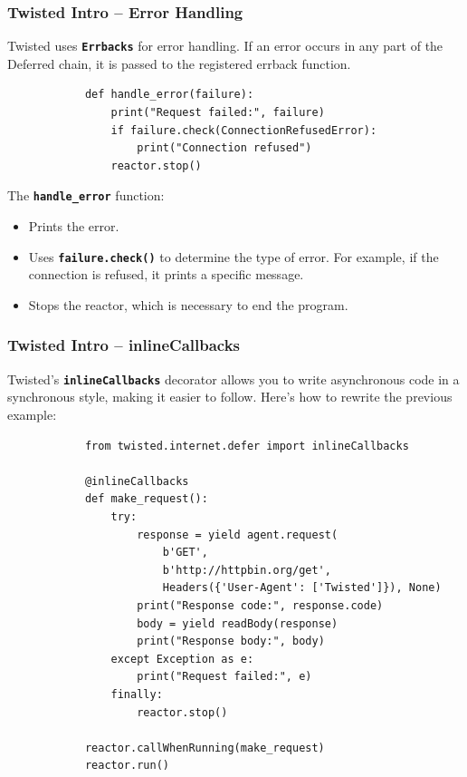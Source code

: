\documentclass{beamer}
\begin{document}
    \begin{frame}[containsverbatim]
        \frametitle{Twisted Intro -- Error Handling}

        Twisted uses \textbf{\texttt{Errbacks}} for error handling. If an error occurs in any part of the Deferred chain, it is passed to the registered errback function.
        \begin{lstlisting}
            def handle_error(failure):
                print("Request failed:", failure)
                if failure.check(ConnectionRefusedError):
                    print("Connection refused")
                reactor.stop()
            \end{lstlisting}
            \noindent The \textbf{\texttt{handle\_error}} function:
            \begin{itemize}
                \item Prints the error.
                \item Uses \textbf{\texttt{failure.check()}} to determine the type of error. For example, if the connection is refused, it prints a specific message.
                \item Stops the reactor, which is necessary to end the program.
            \end{itemize}
    \end{frame}

    \begin{frame}[containsverbatim]
        \frametitle{Twisted Intro -- inlineCallbacks}
        Twisted's \textbf{\texttt{inlineCallbacks}} decorator allows you to write asynchronous code in a synchronous style, making it easier to follow. Here's how to rewrite the previous example:

        \begin{lstlisting}
            from twisted.internet.defer import inlineCallbacks

            @inlineCallbacks
            def make_request():
                try:
                    response = yield agent.request(
                        b'GET',
                        b'http://httpbin.org/get',
                        Headers({'User-Agent': ['Twisted']}), None)
                    print("Response code:", response.code)
                    body = yield readBody(response)
                    print("Response body:", body)
                except Exception as e:
                    print("Request failed:", e)
                finally:
                    reactor.stop()

            reactor.callWhenRunning(make_request)
            reactor.run()
            \end{lstlisting}
    \end{frame}
\end{document}
